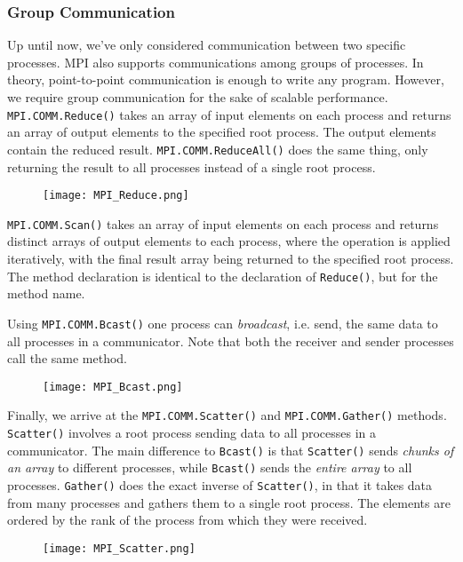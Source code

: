 \documentclass[main]{subfiles}
\begin{document}
\subsubsection{Group Communication}
Up until now, we've only considered communication between two specific processes. MPI also supports communications among groups of processes. In theory, point-to-point communication is enough to write any program. However, we require group communication for the sake of scalable performance.\\[3mm]
\texttt{MPI.COMM.Reduce()} takes an array of input elements on each process and returns an array of output elements to the specified root process. The output elements contain the reduced result. \texttt{MPI.COMM.ReduceAll()} does the same thing, only returning the result to all processes instead of a single root process.\\[3mm]
\begin{figure}[H]
    \centering
    \texttt{[image: MPI\_Reduce.png]}
\end{figure}
\texttt{MPI.COMM.Scan()} takes an array of input elements on each process and returns distinct arrays of output elements to each process, where the operation is applied iteratively, with the final result array being returned to the specified root process. The method declaration is identical to the declaration of \texttt{Reduce()}, but for the method name.\\[3mm]

\newpage

Using \texttt{MPI.COMM.Bcast()} one process can \textit{broadcast}, i.e. send, the same data to all processes in a communicator. Note that both the receiver and sender processes call the same method.
\begin{figure}[H]
    \centering
    \texttt{[image: MPI\_Bcast.png]}
\end{figure}
Finally, we arrive at the \texttt{MPI.COMM.Scatter()} and \texttt{MPI.COMM.Gather()} methods. \texttt{Scatter()} involves a root process sending data to all processes in a communicator. The main difference to \texttt{Bcast()} is that \texttt{Scatter()} sends \textit{chunks of an array} to different processes, while \texttt{Bcast()} sends the \textit{entire array} to all processes. \texttt{Gather()} does the exact inverse of \texttt{Scatter()}, in that it takes data from many processes and gathers them to a single root process. The elements are ordered by the rank of the process from which they were received.
\begin{figure}[H]
    \centering
    \texttt{[image: MPI\_Scatter.png]}
\end{figure}
\end{document}

